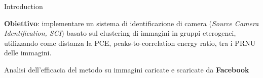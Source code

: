 
\begin{tframe}{Introduction}

\vspace{0.5cm}

\textbf{Obiettivo}: implementare un sistema di identificazione di camera (\emph{Source Camera Identification, SCI}) basato sul clustering di immagini in gruppi eterogenei, utilizzando come distanza la PCE, peaks-to-correlation energy ratio, tra i PRNU delle immagini. 

\vspace{1cm}
Analisi dell'efficacia del metodo su immagini caricate e scaricate da \textbf{Facebook}

\end{tframe}
